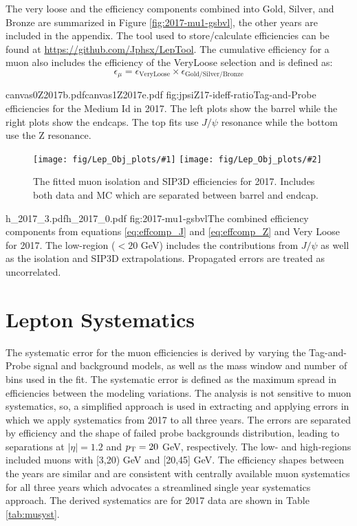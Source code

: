 The very loose and the efficiency components combined into Gold, Silver, and Bronze are summarized in Figure \ref{fig:2017-mu1-gsbvl}, the other years are included in the appendix. The tool used to store/calculate efficiencies can be found at \url{https://github.com/Jphsx/LepTool}.  The cumulative efficiency for a muon also includes the efficiency of the VeryLoose selection and is defined as:
\begin{equation}
\epsilon_\mu = \epsilon_{\text{VeryLoose}} \times \epsilon_{\text{Gold/Silver/Bronze}}
\end{equation}

\newcommand\FigureTwo[4]{%
\begin{figure}[!htbp]%
\centering
\texttt{[image: fig/Lep\_Obj\_plots/\#1]}\hfill
\texttt{[image: fig/Lep\_Obj\_plots/\#2]}\hfill
\caption{#4}
\label{#3}
\end{figure}}

%
           {canvas0Z2017b.pdf}{canvas1Z2017e.pdf}%
          {fig:jpsiZ17-ideff-ratio}{Tag-and-Probe efficiencies for the Medium Id in 2017. The left plots show the barrel while the right plots show the endcaps. The top fits use $J/\psi$ resonance while the bottom use the Z resonance. }

\FigureTwo{effFit_2.pdf}{effFit_5.pdf}%
          {fig:eff17-extraps}{The fitted muon isolation and SIP3D efficiencies for 2017. Includes both data and MC which are separated between barrel and endcap.  }



		   {h_2017_3.pdf}{h_2017_0.pdf}
		   {fig:2017-mu1-gsbvl}{The combined efficiency components from equations \ref{eq:effcomp_J} and \ref{eq:effcomp_Z} and Very Loose for 2017. The low-\pt region ($<20$ GeV) includes the contributions from $J/\psi$ as well as the isolation and SIP3D extrapolations. Propagated errors are treated as uncorrelated.}


\section{Lepton Systematics}

The systematic error for the muon efficiencies is derived by varying the Tag-and-Probe signal and background models, as well as the mass window and number of bins used in the fit. The systematic error is defined as the maximum spread in efficiencies between the modeling variations. The analysis is not sensitive to muon systematics, so, a simplified approach is used in extracting and applying errors in which we apply systematics from 2017 to all three years. The errors are separated by efficiency and the shape of failed probe backgrounds distribution, leading to separations at $|\eta|=1.2$ and $p_{\mathrm{T}}=20$ GeV, respectively. The low- and high-\pt regions included muons with [3,20) GeV and [20,45] GeV. The efficiency shapes between the years are similar and are consistent with centrally available muon systematics for all three years which advocates a streamlined single year systematics approach. The derived systematics are for 2017 data are shown in Table \ref{tab:musyst}.
